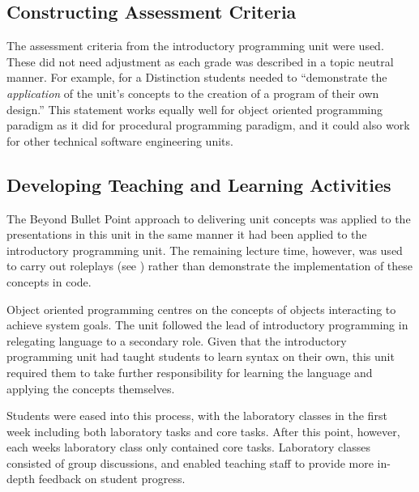
\subsection{Constructing Assessment Criteria} %
\label{sub:oop_constructing_assessment_criteria}

The assessment criteria from the introductory programming unit were used. These did not need adjustment as each grade was described in a topic neutral manner. For example, for a Distinction students needed to ``demonstrate the \emph{application} of the unit's concepts to the creation of a program of their own design.'' This statement works equally well for object oriented programming paradigm as it did for procedural programming paradigm, and it could also work for other technical software engineering units.


\subsection{Developing Teaching and Learning Activities} %
\label{sub:oop_developing_teaching_and_learning_activities}

The Beyond Bullet Point approach to delivering unit concepts was applied to the presentations in this unit in the same manner it had been applied to the introductory programming unit. The remaining lecture time, however, was used to carry out roleplays (see \cite{Borstler:2005}) rather than demonstrate the implementation of these concepts in code.

Object oriented programming centres on the concepts of objects interacting to achieve system goals. The unit followed the lead of introductory programming in relegating language to a secondary role. Given that the introductory programming unit had taught students to learn syntax on their own, this unit required them to take further responsibility for learning the language and applying the concepts themselves.

Students were eased into this process, with the laboratory classes in the first week including both laboratory tasks and core tasks. After this point, however, each weeks laboratory class only contained core tasks. Laboratory classes consisted of group discussions, and enabled teaching staff to provide more in-depth feedback on student progress.

